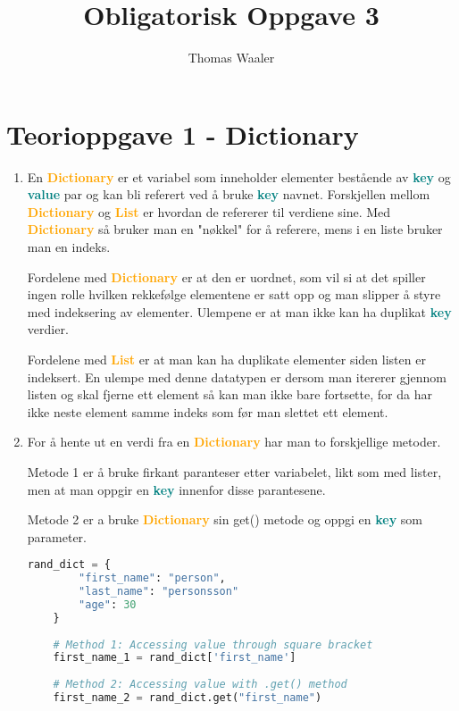\documentclass[10pt,a4paper]{article}
\author{Thomas Waaler}
\title{Obligatorisk Oppgave 3}
\begin{document}
\maketitle


\section*{Teorioppgave 1 - Dictionary}
\begin{enumerate}[label=\alph*)]
	\item En \textcolor{orange}{\textbf{Dictionary}} er et variabel som inneholder elementer bestående av \textcolor{teal}{\textbf{key}} og \textcolor{teal}{\textbf{value}} par og kan bli referert ved å bruke \textcolor{teal}{\textbf{key}} navnet.  Forskjellen mellom \textcolor{orange}{\textbf{Dictionary}} og \textcolor{orange}{\textbf{List}} er hvordan de refererer til verdiene sine.  Med \textcolor{orange}{\textbf{Dictionary}} så bruker man en "nøkkel" for å referere,  mens i en liste bruker man en indeks.
	
	Fordelene med \textcolor{orange}{\textbf{Dictionary}} er at den er uordnet, som vil si at det spiller ingen rolle hvilken rekkefølge elementene er satt opp og man slipper å styre med indeksering av elementer.  Ulempene er at man ikke kan ha duplikat \textcolor{teal}{\textbf{key}} verdier.
	
	Fordelene med \textcolor{orange}{\textbf{List}} er at man kan ha duplikate elementer siden listen er indeksert.  En ulempe med denne datatypen er dersom man itererer gjennom listen og skal fjerne ett element så kan man ikke bare fortsette,  for da har ikke neste element samme indeks som før man slettet ett element.
	
	\item For å hente ut en verdi fra en \textcolor{orange}{\textbf{Dictionary}} har man to forskjellige metoder. 
	
	Metode 1 er å bruke firkant paranteser etter variabelet,  likt som med lister,  men at man oppgir en \textcolor{teal}{\textbf{key}} innenfor disse parantesene.
	
	Metode 2 er a bruke 	\textcolor{orange}{\textbf{Dictionary}} sin get() metode og oppgi en \textcolor{teal}{\textbf{key}} som parameter.
	\begin{lstlisting}[language=Python]
	rand_dict = {
		"first_name": "person",
		"last_name": "personsson"		
		"age": 30
	}
	
	# Method 1: Accessing value through square bracket
	first_name_1 = rand_dict['first_name']
	
	# Method 2: Accessing value with .get() method
	first_name_2 = rand_dict.get("first_name")
	\end{lstlisting}
\end{enumerate}
\end{document}
